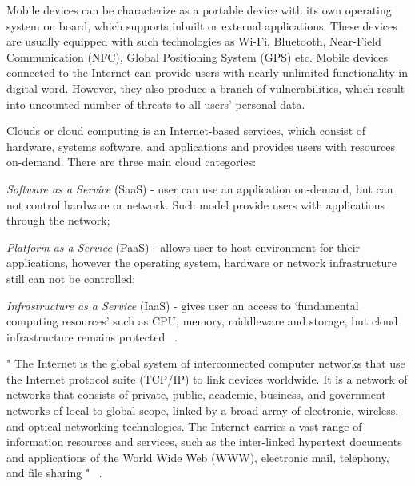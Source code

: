\documentclass[12pt]{article}
\begin{document}
Mobile devices can be characterize as a portable device with its own operating system on board, which supports inbuilt or external applications. These devices are usually equipped with such technologies as Wi-Fi, Bluetooth, Near-Field Communication (NFC), Global Positioning System (GPS) etc. Mobile devices connected to the Internet can provide users with nearly unlimited functionality in digital word. However, they also produce a branch of vulnerabilities, which result into uncounted number of threats to all users' personal data.

Clouds or cloud computing is an Internet-based services, which consist of hardware, systems software, and applications and provides users with resources on-demand. There are three main cloud categories:
\begin{enumerate*}[label=(\roman*)]
 \item \textit{Software as a Service} (SaaS) - user can use an application on-demand, but can not control hardware or network. Such model provide users with applications through the network; 
 \item \textit{Platform as a Service} (PaaS) - allows user to host environment for their applications, however the operating system, hardware or network infrastructure still can not be controlled; 
 \item \textit{Infrastructure as a Service} (IaaS) - gives user an access to ‘fundamental computing resources’ such as CPU, memory, middleware and storage, but cloud infrastructure remains protected ~\cite{Cloud}.
\end{enumerate*}

" The Internet is the global system of interconnected computer networks that use the Internet protocol suite (TCP/IP) to link devices worldwide. It is a network of networks that consists of private, public, academic, business, and government networks of local to global scope, linked by a broad array of electronic, wireless, and optical networking technologies. The Internet carries a vast range of information resources and services, such as the inter-linked hypertext documents and applications of the World Wide Web (WWW), electronic mail, telephony, and file sharing " ~\cite{INT}.
\end{document}
